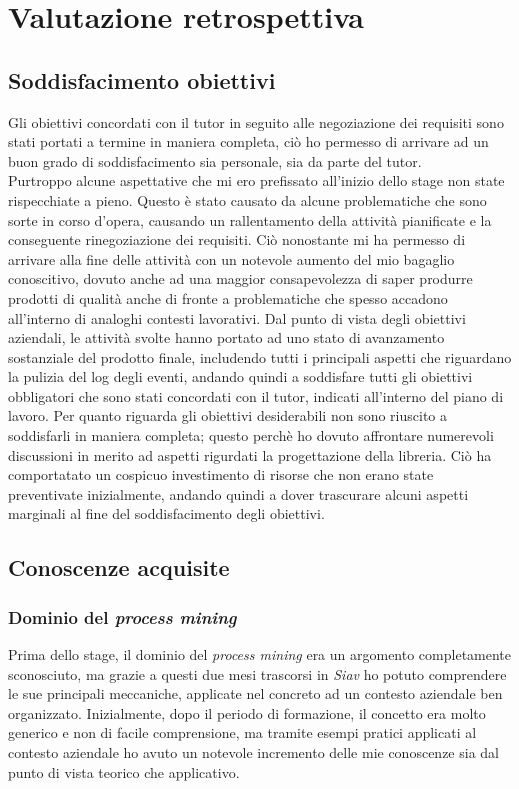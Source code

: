 
\chapter{Valutazione retrospettiva}
\label{cap:valutazione-retrospettiva}


\section{Soddisfacimento obiettivi}
Gli obiettivi concordati con il tutor in seguito alle negoziazione dei requisiti sono stati portati a termine in maniera completa, ciò ho permesso di arrivare ad un buon grado di soddisfacimento sia personale, sia da parte del tutor.\\
Purtroppo alcune aspettative che mi ero prefissato all'inizio dello stage non state rispecchiate a pieno. Questo è stato causato da alcune problematiche che sono sorte in corso d'opera, causando un rallentamento della attività pianificate e la conseguente rinegoziazione dei requisiti. Ciò nonostante mi ha permesso di arrivare alla fine delle attività con un notevole aumento del mio bagaglio conoscitivo, dovuto anche ad una maggior consapevolezza di saper produrre prodotti di qualità anche di fronte a problematiche che spesso accadono all'interno di analoghi contesti lavorativi. Dal punto di vista degli obiettivi aziendali, le attività svolte hanno portato ad uno stato di avanzamento sostanziale del prodotto finale, includendo tutti i principali aspetti che riguardano la pulizia del log degli eventi, andando quindi a soddisfare tutti gli obiettivi obbligatori che sono stati concordati con il tutor, indicati all'interno del piano di lavoro. Per quanto riguarda gli obiettivi desiderabili non sono riuscito a soddisfarli in maniera completa; questo perchè ho dovuto affrontare numerevoli discussioni in merito ad aspetti rigurdati la progettazione della libreria. Ciò ha comportatato un cospicuo investimento di risorse che non erano state preventivate inizialmente, andando quindi a dover trascurare alcuni aspetti marginali al fine del soddisfacimento degli obiettivi.
\section{Conoscenze acquisite}
\subsection{Dominio del \textit{process mining}}
Prima dello stage, il dominio del \textit{process mining} era un argomento completamente sconosciuto, ma grazie a questi due mesi trascorsi in \textit{Siav} ho potuto comprendere le sue principali meccaniche, applicate nel concreto ad un contesto aziendale ben organizzato. Inizialmente, dopo il periodo di formazione, il concetto era molto generico e non di facile comprensione, ma tramite esempi pratici applicati al contesto aziendale ho avuto un notevole incremento delle mie conoscenze sia dal punto di vista teorico che applicativo.
